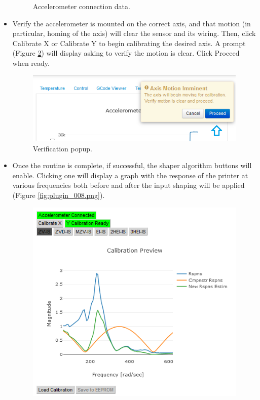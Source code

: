 \documentclass[12pt]{article}
\begin{document}
\begin{itemize}
\begin{figure}[H]
			\caption{Accelerometer connection data.}
			\label{fig:plugin_006.png}
		\end{figure}
	\item Verify the accelerometer is mounted on the correct axis, and that motion (in particular, homing of the axis) will clear the sensor and its wiring. Then, click Calibrate X or Calibrate Y to begin calibrating the desired axis. A prompt (Figure \ref{fig:plugin_007.png}) will display asking to verify the motion is clear. Click Proceed when ready.
		\begin{figure}[H]
			\centering
			\includegraphics{plugin_007.png}
			\caption{Verification popup.}
			\label{fig:plugin_007.png}
		\end{figure}
	\item Once the routine is complete, if successful, the shaper algorithm buttons will enable. Clicking one will display a graph with the response of the printer at various frequencies both before and after the input shaping will be applied (Figure \ref{fig:plugin_008.png}).
		\begin{figure}[H]
			\centering
			\includegraphics{plugin_008.png}

\end{figure}
\end{itemize}
\end{document}
